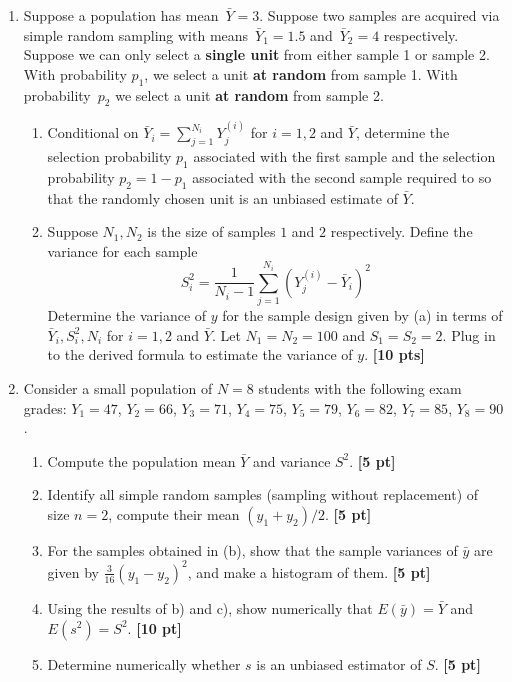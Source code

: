 \documentclass[12pt]{article}
\def\given{\, | \,}
\begin{document}
\begin{enumerate}
\begin{enumerate}
		\item Show numerically using the above example that $E (X) = E(E(X \given C) )$ and $V(X) = V(E(X \given C)) + E(V(X \given C))$ {\bf [10 pt]}

		\end{enumerate}

\item Suppose a population has mean~$\bar Y = 3$. Suppose two samples are acquired via simple random sampling with means~$\bar Y_1 = 1.5$ and~$\bar Y_2 = 4$ respectively.  Suppose we can only select a {\bf single unit} from either sample 1 or sample 2.  With probability $p_1$, we select a unit {\bf at random} from sample 1.  With probability~$p_2$ we select a unit {\bf at random} from sample 2.

	\begin{enumerate}
		\item Conditional on $\bar Y_i = \sum_{j=1}^{N_i} Y_j^{(i)}$ for $i=1,2$ and $\bar Y$, determine the selection probability $p_1$ associated with the first sample and the selection probability $p_2 = 1-p_1$ associated with the second sample required to so that the randomly chosen unit is an unbiased estimate of $\bar Y$.
		\item Suppose $N_1, N_2$ is the size of samples $1$ and $2$ respectively.  Define the variance for each sample
			$$S_i^2= \frac{1}{N_i-1} \sum_{j=1}^{N_i} (Y_j^{(i)} - \bar Y_i)^2 $$
		Determine the variance of $y$ for the sample design given by (a) in terms of $\bar Y_i, S_i^2, N_i$ for $i=1,2$ and $\bar Y$. Let $N_1 = N_2 = 100$ and $S_1 = S_2 = 2$.  Plug in to the derived formula to estimate the variance of $y$. {\bf [10 pts]}
	\end{enumerate}

\item Consider a small population of $N = 8$ students with the following exam grades: $Y_1 = 47$, $Y_2 = 66$, $Y_3 = 71$, $Y_4 = 75$, $Y_5 = 79$, $Y_6 = 82$, $Y_7 = 85$, $Y_8 = 90$.

	\begin{enumerate}
		\setlength{\itemsep}{15pt}%
		\setlength{\parskip}{15pt}%

		\item Compute the population mean $\bar Y$ and variance $S^2$. {\bf [5 pt]}
		\item Identify all simple random samples (sampling without replacement) of size $n=2$, compute their mean $(y_1 + y_2)/2$. {\bf [5 pt]}
		\item For the samples obtained in (b), show that the sample variances of $\bar y$ are given by $\frac{3}{16} (y_1 - y_2)^2$, and make a histogram of them. {\bf [5 pt]}
		\item Using the results of b) and c), show numerically that $E(\bar y) = \bar Y$ and $E (s^2) = S^2$. {\bf [10 pt]}
		\item Determine numerically whether $s$ is an unbiased estimator of $S$. {\bf [5 pt]}
	\end{enumerate}


\end{enumerate}
\end{document}
